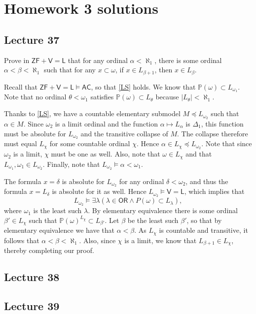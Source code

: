 \documentclass[10pt,letterpaper,cm]{nupset}
\theoremstyle{definition}
\theoremstyle{theorem}
\theoremstyle{remark}
\renewcommand{\P}{\mathbb P}
\newcommand{\1}{\mathbf{1}}
\newcommand{\0}{\vec 0}
\newcommand{\zf}{\mathsf{ZF}}
\newcommand{\ac}{\mathsf{AC}}
\newcommand{\ord}{\mathsf{OR}}
\newcommand{\VL}{\mathsf{V=L}}
\begin{document}
\section{Homework 3 solutions}

\subsection{Lecture 37}

\begin{problem}

Prove in $\zf + \VL$ that for any ordinal $\alpha < \aleph_1$, there is some ordinal $\alpha < \beta < \aleph_1$ such that for any $x\subset \omega$, if $x\in L_{\beta+1}$, then $x\in L_{\beta}$.
\end{problem}
\begin{solution}
Recall that $\zf+ \VL \models \ac$, so that \cref{LS} holds. We know that $\P(\omega)\subset L_{\omega_1}$. Note that no ordinal $\theta < \omega_1$ satisfies $\P(\omega)\subset L_{\theta}$ because $\left\lvert{L_{\theta}}\right\rvert<\aleph_1$.

\smallskip

Thanks to \cref{LS}, we have a countable elementary submodel $M\preceq L_{\omega_2}$ such that ${\alpha}\in M$. Since $\omega_2$ is a limit ordinal and the function $\alpha \mapsto L_{\alpha}$ is $\Delta_1$, this function must be absolute for $L_{\omega_{2}}$ and the transitive collapse of $M$. The collapse therefore must equal $L_{\chi}$ for some countable ordinal $\chi$. Hence ${\alpha}\in  L_{\chi} \preceq L_{\omega_2}$. Note that since $\omega_2$ is a limit, $\chi$ must be one as well. Also, note that $\omega \in L_{\chi}$ and that $L_{\omega_1}, \omega_1 \in L_{\omega_2}$. Finally, note that $L_{\omega_2} \models \alpha < \omega_1$. 

\smallskip

The formula $x=\delta$ is absolute for $L_{\omega_2}$ for any ordinal $\delta < \omega_2$, and thus the formula $x=L_{\delta}$ is absolute for it as well. Hence $L_{\omega_2}\models \VL$, which implies that $$L_{\omega_2}\models \exists \lambda(\lambda \in \ord \land P(\omega)\subset L_{\lambda}),$$ where $\omega_1$ is the least such $\lambda$.
By elementary equivalence there is some ordinal $\beta' \in L_{\chi}$ such that $\P(\omega)^{L_{\chi}}\subset L_{\beta'}$. Let $\beta$ be the least such $\beta '$, so that by elementary equivalence we have that $\alpha <\beta$. As $L_\chi$ is countable and transitive, it follows that $\alpha < \beta < \aleph_1$. Also, since $\chi$ is a limit, we know that $L_{\beta+1}\in L_{\chi}$, thereby completing our proof.
\end{solution}

\subsection{Lecture 38}

\subsection{Lecture 39}
\end{document}
